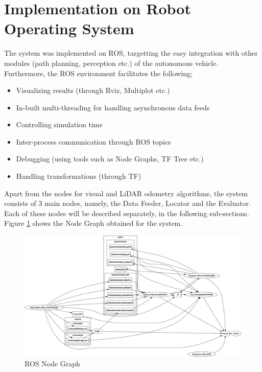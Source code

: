\section{Implementation on Robot Operating System}
The system was implemented on \gls{ROS}, targetting the easy integration with other modules (path planning, perception etc.) of the autonomous vehicle. Furthermore, the \gls{ROS} environment facilitates the following;
\begin{itemize}
	\item Visualizing results (through Rviz, Multiplot etc.)
	\item In-built multi-threading for handling asynchronous data feeds
	\item Controlling simulation time
	\item Inter-process communication through \gls{ROS} topics
	\item Debugging (using tools such as Node Graphs, TF Tree etc.)
	\item Handling transformations (through TF)
\end{itemize}
Apart from the nodes for visual and \gls{LiDAR} odometry algorithms, the system consists of 3 main nodes, namely, the Data Feeder, Locator and the Evaluator. Each of these nodes will be described separately, in the following sub-sections. Figure \ref{fig:pa:nodeGraph} shows the Node Graph obtained for the system.

\begin{figure}[htp]
	\begin{center}
	\includegraphics[width=\textwidth]{figs/rosgraph.png}
	\end{center}
	\vspace{-0.5cm}
	\caption[ROS Node Graph]{ROS Node Graph}
	\label{fig:pa:nodeGraph}
	\vspace{0.5cm}
\end{figure}

